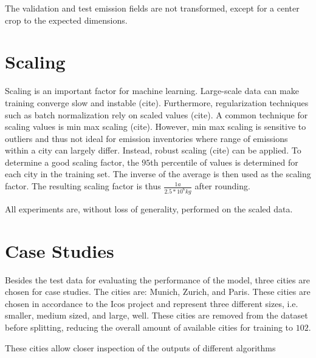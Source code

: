 The validation and test emission fields are not transformed, except for a center crop to the expected dimensions.

\section{Scaling}
Scaling is an important factor for machine learning.
Large-scale data can make training converge slow and instable (cite).
Furthermore, regularization techniques such as batch normalization \parencite{BatchNorm} rely on scaled values (cite).
A common technique for scaling values is min max scaling (cite).
However, min max scaling is sensitive to outliers and thus not ideal for emission inventories where range of emissions within a city can largely differ.
Instead, robust scaling (cite) can be applied.
To determine a good scaling factor, the $95$th percentile of values is determined for each city in the training set.
The inverse of the average is then used as the scaling factor.
The resulting scaling factor is thus $\frac{1 a}{2.5 * 10^6 kg}$ after rounding.

All experiments are, without loss of generality, performed on the scaled data.

\section{Case Studies}
Besides the test data for evaluating the performance of the model, three cities are chosen for case studies.
The cities are: Munich, Zurich, and Paris.
These cities are chosen in accordance to the Icos project \parencite{Icos} and represent three different sizes, i.e. smaller, medium sized, and large, well.
These cities are removed from the dataset before splitting, reducing the overall amount of available cities for training to $102$.

These cities allow closer inspection of the outputs of different algorithms
